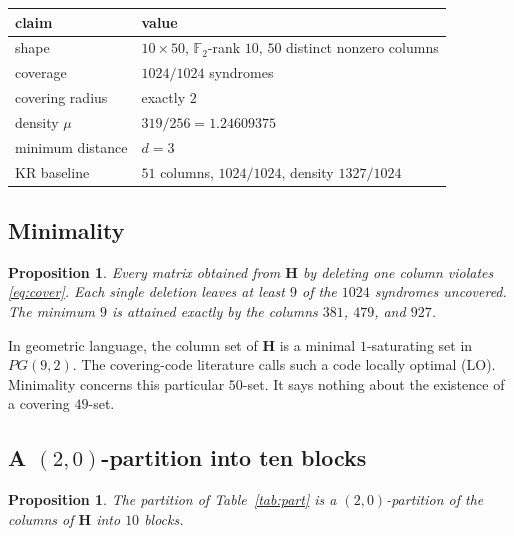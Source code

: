 \documentclass[11pt,a4paper]{article}
\newcommand{\FF}{\mathbb{F}}
\newcommand{\HH}{\boldsymbol{H}}
\newtheorem{proposition}[theorem]{Proposition}
\theoremstyle{remark}
\begin{document}
\begin{center}
\renewcommand{\arraystretch}{1.15}
\begin{tabular}{@{}ll@{}}
\toprule
claim & value \\
\midrule
shape & $10\times 50$, $\FF_2$-rank $10$, $50$ distinct nonzero columns \\
coverage & $1024/1024$ syndromes \\
covering radius & exactly $2$ \\
density $\mu$ & $319/256=1.24609375$ \\
minimum distance & $d=3$ \\
KR baseline & $51$ columns, $1024/1024$, density $1327/1024$ \\
\bottomrule
\end{tabular}
\end{center}

\subsection{Minimality}

\begin{proposition}
\label{prop:min}
Every matrix obtained from $\HH$ by deleting one column violates
\eqref{eq:cover}. Each single deletion leaves at least $9$ of the
$1024$ syndromes uncovered. The minimum $9$ is attained exactly by the
columns $381$, $479$, and $927$.
\end{proposition}

In geometric language, the column set of $\HH$ is a minimal
$1$-saturating set in $PG(9,2)$. The covering-code literature calls
such a code locally optimal (LO). Minimality concerns this particular
$50$-set. It says nothing about the existence of a covering $49$-set.

\subsection{A $(2,0)$-partition into ten blocks}

\begin{proposition}
\label{prop:part}
The partition of Table~\ref{tab:part} is a $(2,0)$-partition of the
columns of $\HH$ into $10$ blocks.
\end{proposition}
\end{document}
